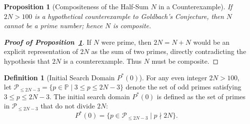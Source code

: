 \documentclass[11pt,a4paper]{article}
\newtheorem{proposition}[theorem]{Proposition}
\theoremstyle{definition}
\newtheorem{definition}[theorem]{Definition}
\begin{document}
\begin{proposition}[Compositeness of the Half-Sum $N$ in a Counterexample]
\label{prop:half_sum}
If $2N > 100$ is a hypothetical counterexample to Goldbach's Conjecture, then $N$ cannot be a prime number; hence $N$ is composite.
\end{proposition}
\begin{proof}[\textbf{Proof of Proposition~\ref{prop:half_sum}}]
If $N$ were prime, then $2N = N + N$ would be an explicit representation of $2N$ as the sum of two primes, directly contradicting the hypothesis that $2N$ is a counterexample. Thus $N$ must be composite.
\end{proof}

\begin{definition}[Initial Search Domain $P^*(0)$]
\label{def:initial_domain}
For any even integer $2N > 100$, let $\mathcal{P}_{\le 2N-3} = \{ p \in \mathbb{P} \mid 3 \le p \le 2N - 3 \}$ denote the set of odd primes satisfying $3 \le p \le 2N - 3$. The initial search domain $P^*(0)$ is defined as the set of primes in $\mathcal{P}_{\le 2N-3}$ that do not divide $2N$:
\[
P^*(0) = \{ p \in \mathcal{P}_{\le 2N-3} \mid p \nmid 2N \}.
\]
\end{definition}
\end{document}
